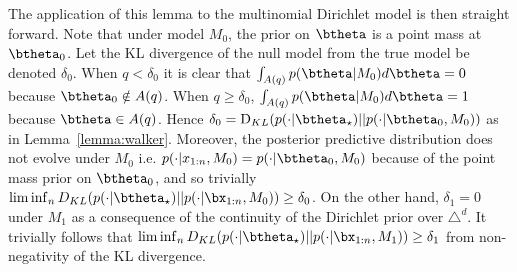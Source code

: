 \documentclass[11pt]{article}
\newcommand{\KL}{\mathrm{D}_{KL}}
\begin{document}
The application of this lemma to the multinomial Dirichlet model is then straight forward.
Note that under model $M_0$, the prior on $\btheta$ is a point mass at $\btheta_0$.
Let the KL divergence of the null model from the true model be denoted $\delta_0$. When $q<\delta_0$ it is clear that $\int_{A(q)} p(\btheta|M_0) d\btheta = 0$ because $\btheta_0 \notin A(q)$. When $q\geq \delta_0$, $\int_{A(q)} p(\btheta|M_0) d\btheta = 1$ because $\btheta \in A(q)$. 
Hence $\delta_0 = \KL (p(\cdot|\btheta_\star) || p(\cdot|\btheta_0, M_0))$ as in Lemma~\ref{lemma:walker}.
Moreover, the posterior predictive distribution does not evolve under $M_0$ i.e. $p(\cdot|x_{1:n},M_0) = p(\cdot|\btheta_0,M_0)$ because of the point mass prior on $\btheta_0$, and so 
trivially  $\lim \inf_n D_{KL}(p(\cdot|\btheta_\star)||p(\cdot|\bx_{1:n}, M_0) ) \geq \delta_0$. 
On the other hand, $\delta_1 = 0$ under $M_1$ as a consequence of the continuity of the Dirichlet prior over $\triangle^d$.
It trivially follows that $\lim \inf_n D_{KL}(p(\cdot|\btheta_\star)||p(\cdot|\bx_{1:n}, M_1) ) \geq \delta_1$ from non-negativity of the KL divergence.
\end{document}

